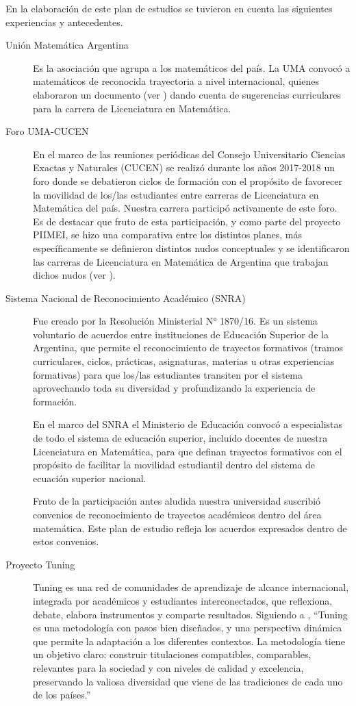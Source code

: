 \documentclass[a4paper, 12pt]{article}
\begin{document}
En la elaboración de este plan de estudios se tuvieron en cuenta las siguientes experiencias y antecedentes.
\begin{description}
 \item[Unión Matemática Argentina]  Es la asociación que agrupa a los matemáticos del país.  La UMA convocó a matemáticos de reconocida trayectoria a nivel internacional, quienes elaboraron un documento (ver \cite{uma}) 
 dando cuenta de sugerencias curriculares para la carrera de Licenciatura en Matemática.
 
 \item[Foro UMA-CUCEN] En el marco de las reuniones periódicas del Consejo Universitario Ciencias Exactas y Naturales (CUCEN) se realizó durante los años 2017-2018 un foro donde se debatieron ciclos de formación con el propósito de favorecer la movilidad de los/las estudiantes entre carreras de Licenciatura en Matemática del país. Nuestra carrera participó activamente de este foro. Es de destacar que fruto de esta participación, y como parte del proyecto PIIMEI, se hizo una comparativa entre los distintos planes, más específicamente se definieron distintos nudos conceptuales y se identificaron las carreras de Licenciatura en Matemática de Argentina que trabajan dichos nudos (ver \cite{CCP}). 

\item[Sistema Nacional de Reconocimiento Académico (SNRA)] Fue creado por la Resolución Ministerial N° 1870/16. Es un sistema voluntario de acuerdos entre instituciones de Educación Superior de la Argentina, que permite el reconocimiento de trayectos formativos (tramos curriculares, ciclos, prácticas, asignaturas, materias u otras experiencias formativas) para que los/las estudiantes transiten por el sistema aprovechando toda su diversidad y profundizando la experiencia de formación.

En el marco del SNRA el Ministerio de Educación convocó a especialistas de todo el sistema de educación superior, incluido docentes de nuestra Licenciatura en Matemática,  para que definan trayectos formativos con el propósito de facilitar la movilidad estudiantil dentro del sistema de ecuación superior nacional. 

Fruto de la participación antes aludida nuestra universidad suscribió convenios de reconocimiento de trayectos académicos dentro del área matemática. Este plan de estudio refleja los acuerdos expresados dentro de estos convenios.

\item[Proyecto Tuning] Tuning es una red de comunidades de aprendizaje de alcance internacional, integrada por académicos y estudiantes interconectados, que reflexiona, debate, elabora instrumentos
y comparte resultados. Siguiendo a \cite{paniagua2013educacion},
 ``Tuning es una metodología con pasos bien diseñados, y una perspectiva dinámica que permite la adaptación a los diferentes contextos. La metodología tiene un objetivo claro: construir titulaciones compatibles, comparables, relevantes para la sociedad y con niveles
de calidad y excelencia, preservando la valiosa diversidad que viene de las
tradiciones de cada uno de los países.'' 


\end{description}
\end{document}
